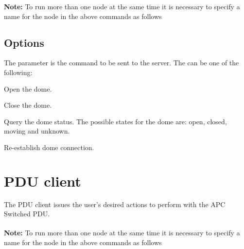 \documentclass[a4paper,english]{article}
\begin{document}
\textbf{Note:} To run more than one  node at the same time it is necessary to specify a name for the node in the above commands as follows 


\subsection{Options}

The  parameter is the command to be sent to the server. The  can be one of the following:

\begin{Description}\setlength{\itemsep}{0cm}
\item[\Arg{open}] Open the dome. 

	   
	
\item[\Arg{close}] Close the dome.

	   
	
\item[\Arg{status}] Query the dome status. The possible states for the dome are: open, closed, moving and unknown.

	   
	
\item[\Arg{reconnect}] Re-establish dome connection.

	   
	
\end{Description}

\section{PDU client}

The PDU client issues the user's desired actions to perform with the APC Switched PDU. \\

    \\

\textbf{Note:} To run more than one  node at the same time it is necessary to specify a name for the node in the above commands as follows 
\end{document}
